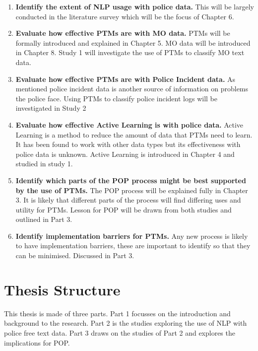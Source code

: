 \begin{enumerate}
\item {\bf Identify the extent of NLP usage with police data.} This will be largely conducted in the literature survey which will be the focus of Chapter 6.

\item {\bf Evaluate how effective PTMs are with MO data.} PTMs will be formally introduced and explained in Chapter 5. MO data will be introduced in Chapter 8. Study 1 will investigate the use of PTMs to classify MO text data.

\item {\bf Evaluate how effective PTMs are with Police Incident data.} As mentioned police incident data is another source of information on problems the police face. Using PTMs to classify police incident logs will be investigated in Study 2 

\item {\bf Evaluate how effective Active Learning is with police data.}  Active Learning is a method to reduce the amount of data that PTMs need to learn. It has been found to work with other data types but its effectiveness with police data is unknown. Active Learning is introduced in Chapter 4 and studied in study 1.

\item {\bf Identify which parts of the POP process might be best supported by the use of PTMs.} The POP process will be explained fully in Chapter 3. It is likely that different parts of the process will find differing uses and utility for PTMs. Lesson for POP will be drawn from both studies and outlined in Part 3. 

\item {\bf Identify implementation barriers for PTMs.} Any new process is likely to have implementation barriers, these are important to identify so that they can be minimised. Discussed in Part 3. 

\end{enumerate}



\section{Thesis Structure} This thesis is made of three parts. Part 1 focusses on the introduction and background to the research. Part 2 is the studies exploring the use of NLP with police free text data. Part 3 draws on the studies of Part 2 and explores the implications for POP. 


